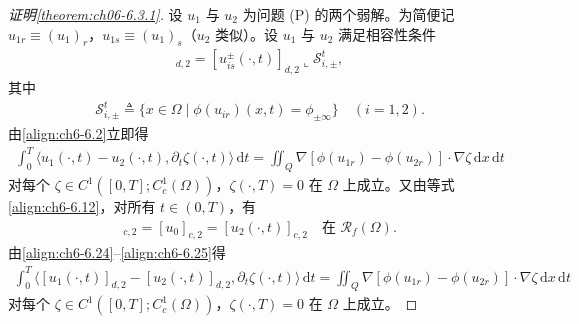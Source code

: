 \documentclass[../../main.tex]{subfiles}%
\begin{document}
\begin{proof}[证明\cref{theorem:ch06-6.3.1}]
设 $u_1$ 与 $u_2$ 为问题 (P) 的两个弱解。为简便记 $u_{1r}\equiv(u_1)_r$，$u_{1s}\equiv(u_1)_s$（$u_2$ 类似）。设 $u_1$ 与 $u_2$ 满足相容性条件
\begin{align}
[u^\pm_{is}(\cdot,t)]_{d,2}=[u^\pm_{is}(\cdot,t)]_{d,2}\llcorner\mathscr{S}^t_{i,\pm}, \label{align:ch6-6.23}
\end{align}
其中
\begin{align*}
\mathscr{S}^t_{i,\pm}\triangleq \{x\in\Omega\mid\phi(u_{ir})(x,t)=\phi_{\pm\infty}\}\quad(i=1,2).
\end{align*}
由\eqref{align:ch6-6.2}立即得
\begin{align}
\int_0^T\langle u_1(\cdot,t)-u_2(\cdot,t),\partial_t\zeta(\cdot,t)\rangle\,\mathrm{d}t
= \iint_Q\nabla[\phi(u_{1r})-\phi(u_{2r})]\cdot\nabla\zeta\,\mathrm{d}x\,\mathrm{d}t \label{align:ch6-6.24}
\end{align}
对每个 $\zeta\in C^1([0,T];C^1_c(\Omega))$，$\zeta(\cdot,T)=0$ 在 $\Omega$ 上成立。又由等式\eqref{align:ch6-6.12}，对所有 $t\in(0,T)$，有
\begin{align}
[u_1(\cdot,t)]_{c,2}=[u_0]_{c,2}=[u_2(\cdot,t)]_{c,2} \quad\text{在 }\mathscr{R}_f(\Omega). \label{align:ch6-6.25}
\end{align}
由\eqref{align:ch6-6.24}--\eqref{align:ch6-6.25}得
\begin{align}
\int_0^T\langle[u_1(\cdot,t)]_{d,2}-[u_2(\cdot,t)]_{d,2},\partial_t\zeta(\cdot,t)\rangle\,\mathrm{d}t
= \iint_Q\nabla[\phi(u_{1r})-\phi(u_{2r})]\cdot\nabla\zeta\,\mathrm{d}x\,\mathrm{d}t \label{align:ch6-6.26}
\end{align}
对每个 $\zeta\in C^1([0,T];C^1_c(\Omega))$，$\zeta(\cdot,T)=0$ 在 $\Omega$ 上成立。


\end{proof}
\end{document}
